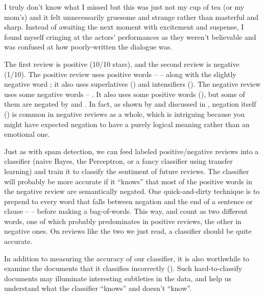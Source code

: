 \ex  I truly don't know what I missed but this was just not my cup of tea (or my mom's) and it felt unnecessarily gruesome and strange rather than masterful and sharp. Instead of awaiting the next moment with excitement and suspense, I found myself cringing at the actors' performances as they weren't believable and was confused at how poorly-written the dialogue was. 

\z 

 The first review is positive (10/10 stars), and the second review is negative (1/10).  The positive review uses positive words --  -- along with the slightly negative word ; it also uses superlatives () and intensifiers ().  The negative review uses some negative words -- .  It also uses some positive words (), but some of them are negated by  and .  In fact, as shown by \citet{Potts:2010} and discussed in , negation itself () is common in  negative reviews as a whole, which is intriguing because you might have expected negation to have a purely logical meaning rather than an emotional one.


Just as with spam detection, we can feed labeled positive/negative reviews into a classifier (naive Bayes, the Perceptron, or a fancy classifier using transfer learning) and train it to classify the sentiment of future reviews.  The classifier will probably be more accurate if it ``knows'' that most of the positive words in the negative review are semantically negated.  One quick-and-dirty technique \citep{DasChen:2007} is to prepend  to every word that falls between negation and the end of a sentence or clause --  -- before making a bag-of-words.  This way,  and   count as two different words, one of which probably predominates in positive reviews, the other in negative ones.  On reviews like the two we just read, a classifier should be quite accurate.

In addition to measuring the accuracy of our classifier, it is also worthwhile to examine the documents that it classifies incorrectly ().  Such hard-to-classify documents may illuminate interesting subtleties in the data, and help us understand what the classifier ``knows'' and doesn't ``know''.  


